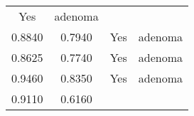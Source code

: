 \documentclass[12pt,]{article}
\begin{document}
\begin{longtable}[]{@{}cccc@{}}
\begin{minipage}[t]{0.22\columnwidth}
Yes\strut
\end{minipage} & \begin{minipage}[t]{0.16\columnwidth}\centering\strut
adenoma\strut
\end{minipage}\tabularnewline
\begin{minipage}[t]{0.24\columnwidth}\centering\strut
0.8840\strut
\end{minipage} & \begin{minipage}[t]{0.26\columnwidth}\centering\strut
0.7940\strut
\end{minipage} & \begin{minipage}[t]{0.22\columnwidth}\centering\strut
Yes\strut
\end{minipage} & \begin{minipage}[t]{0.16\columnwidth}\centering\strut
adenoma\strut
\end{minipage}\tabularnewline
\begin{minipage}[t]{0.24\columnwidth}\centering\strut
0.8625\strut
\end{minipage} & \begin{minipage}[t]{0.26\columnwidth}\centering\strut
0.7740\strut
\end{minipage} & \begin{minipage}[t]{0.22\columnwidth}\centering\strut
Yes\strut
\end{minipage} & \begin{minipage}[t]{0.16\columnwidth}\centering\strut
adenoma\strut
\end{minipage}\tabularnewline
\begin{minipage}[t]{0.24\columnwidth}\centering\strut
0.9460\strut
\end{minipage} & \begin{minipage}[t]{0.26\columnwidth}\centering\strut
0.8350\strut
\end{minipage} & \begin{minipage}[t]{0.22\columnwidth}\centering\strut
Yes\strut
\end{minipage} & \begin{minipage}[t]{0.16\columnwidth}\centering\strut
adenoma\strut
\end{minipage}\tabularnewline
\begin{minipage}[t]{0.24\columnwidth}\centering\strut
0.9110\strut
\end{minipage} & \begin{minipage}[t]{0.26\columnwidth}\centering\strut
0.6160\strut
\end{minipage} & \begin{minipage}[t]{0.22\columnwidth}\centering\strut

\end{minipage}
\end{longtable}
\end{document}
